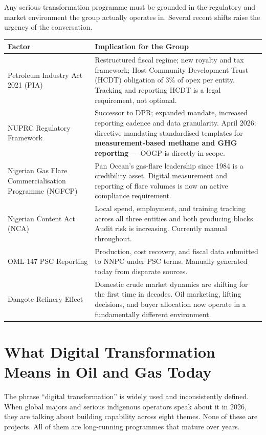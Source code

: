 \documentclass[10pt]{article}
\newcommand{\spacer}{\vspace{10pt}}
\newcommand{\bigspacer}{\vspace{16pt}}
\begin{document}
Any serious transformation programme must be grounded in the regulatory and
market environment the group actually operates in. Several recent shifts
raise the urgency of the conversation.

\spacer
\small
\begin{tabularx}{\columnwidth}{@{}lX@{}}
\toprule
\textbf{Factor} & \textbf{Implication for the Group} \\
\midrule
Petroleum Industry Act 2021 (PIA)
  & Restructured fiscal regime; new royalty and tax framework; Host Community
    Development Trust (HCDT) obligation of 3\% of opex per entity. Tracking
    and reporting HCDT is a legal requirement, not optional. \\
NUPRC Regulatory Framework
  & Successor to DPR; expanded mandate, increased reporting cadence and data
    granularity. April 2026: directive mandating standardised templates for
    \textbf{measurement-based methane and GHG reporting} --- OOGP is directly
    in scope. \\
Nigerian Gas Flare Commercialisation Programme (NGFCP)
  & Pan Ocean's gas-flare leadership since 1984 is a credibility asset.
    Digital measurement and reporting of flare volumes is now an active
    compliance requirement. \\
Nigerian Content Act (NCA)
  & Local spend, employment, and training tracking across all three entities
    and both producing blocks. Audit risk is increasing. Currently manual
    throughout. \\
OML-147 PSC Reporting
  & Production, cost recovery, and fiscal data submitted to NNPC under PSC
    terms. Manually generated today from disparate sources. \\
Dangote Refinery Effect
  & Domestic crude market dynamics are shifting for the first time in
    decades. Oil marketing, lifting decisions, and buyer allocation now
    operate in a fundamentally different environment. \\
\bottomrule
\end{tabularx}
\normalsize

\bigspacer

\section{What Digital Transformation Means in Oil and Gas Today}

The phrase ``digital transformation'' is widely used and inconsistently defined.
When global majors and serious indigenous operators speak about it in 2026,
they are talking about building capability across eight themes. None of these
are projects. All of them are long-running programmes that mature over years.
\end{document}
